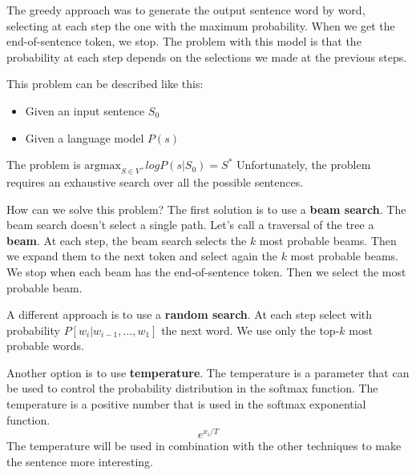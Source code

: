 The greedy approach was to generate the output sentence word by word, selecting at each step the one with the maximum probability.
When we get the end-of-sentence token, we stop.
The problem with this model is that the probability at each step
depends on the selections we made at the previous steps.

This problem can be described like this:
\begin{itemize}
    \item Given an input sentence $S_0$
    \item Given a language model $P(s)$
\end{itemize}
The problem is $\text{argmax}_{S\in V^+}log P(s|S_0) = S^*$
Unfortunately, the problem requires an exhaustive search over all the possible sentences.

How can we solve this problem?
The first solution is to use a \textbf{beam search}.
The beam search doesn't select a single path. Let's call a traversal of the tree
a \textbf{beam}. At each step, the beam search selects the $k$ most probable beams.
Then we expand them to the next token and select again the $k$ most probable beams.
We stop when each beam has the end-of-sentence token.
Then we select the most probable beam.

A different approach is to use a \textbf{random search}.
At each step select with probability $P[w_i|w_{i-1},\dots,w_1]$ the next word.
We use only the top-$k$ most probable words.

Another option is to use \textbf{temperature}.
The temperature is a parameter that can be used to control the probability distribution
in the softmax function.
The temperature is a positive number that is used in the softmax exponential function.
\[
    e^{x_i/T}
\]
The temperature will be used in combination with the other techniques to make the sentence more interesting.
